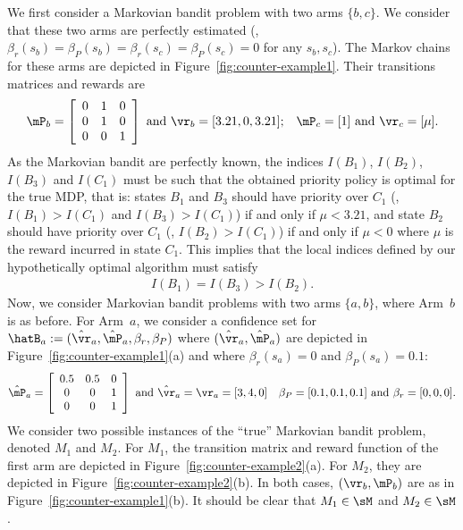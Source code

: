 \begin{subappendices}
We first consider a Markovian bandit problem with two arms $\{b,c\}$. We consider that these two arms are perfectly estimated (\ie, $\beta_{r}(s_b)=\beta_{P}(s_b)=\beta_{r}(s_c)=\beta_{P}(s_c)=0$ for any $s_b,s_c$). The Markov chains for these arms are depicted in Figure~\ref{fig:counter-example1}. Their transitions matrices and rewards are
\begin{align*}
    \mP_b = \left[\begin{array}{ccc}
        0 & 1 & 0\\
        0 & 1 & 0\\
        0 & 0 & 1
    \end{array}\right]
    \text{ and } \vr_b = [3.21,0,3.21];
    && \mP_c = [1] \text{ and } \vr_c = [\mu].
\end{align*}
As the Markovian bandit are perfectly known, the indices $I(B_1)$, $I(B_2)$, $I(B_3)$ and $I(C_1)$ must be such that the obtained priority policy is optimal for the true MDP, that is: states $B_1$ and $B_3$ should have priority over $C_1$ (\ie, $I(B_1)>I(C_1)$ and $I(B_3)>I(C_1)$) if and only if $\mu<3.21$, and state $B_2$ should have priority over $C_1$ (\ie, $I(B_2)>I(C_1)$) if and only if $\mu<0$ where $\mu$ is the reward incurred in state $C_1$. This implies that the local indices defined by our hypothetically optimal algorithm must satisfy
\begin{align*}
    I(B_1) = I(B_3) > I(B_2).
\end{align*}
Now, we consider Markovian bandit problems with two arms $\{a,b\}$, where Arm~$b$ is as before. For Arm~$a$, we consider a confidence set for $\hatB_a:=(\hat{\vr}_a,\hat{\mP}_a,\beta_r,\beta_P)$
where $(\hat{\vr}_a,\hat{\mP}_a)$ are depicted in Figure~\ref{fig:counter-example1}(a) and where $\beta_r(s_a)=0$ and $\beta_P(s_a)=0.1$:
\begin{align*}
    \hat{\mP}_a = \left[\begin{array}{ccc}
        0.5 & 0.5 & 0\\
        0 & 0 & 1\\
        0 & 0 & 1
    \end{array}\right]
    \text{ and }\hat{\vr}_a = \vr_a = [3, 4, 0]
    &&\beta_P = [0.1, 0.1, 0.1] \text{ and }\beta_r=[0,0,0].
\end{align*}
We consider two possible instances of the ``true'' Markovian bandit problem, denoted $M_1$ and $M_2$. For $M_1$, the transition matrix and reward function of the first arm are depicted in Figure~\ref{fig:counter-example2}(a). For $M_2$, they are depicted in Figure~\ref{fig:counter-example2}(b). In both cases, $(\vr_b,\mP_b)$ are as in Figure~\ref{fig:counter-example1}(b). It should be clear that $M_1\in\sM$ and $M_2\in\sM$. 


\end{subappendices}
